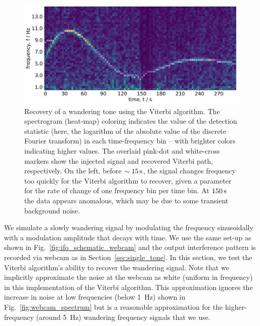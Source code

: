 \documentclass[paper-main.tex]{subfiles}
\begin{document}
\begin{figure}
	\includegraphics[width=\textwidth]{figures/expt_overlay_2_viterbi_test_webcam.pdf}
	\caption{\label{fig:viterbi_overlay}
Recovery of a wandering tone using the Viterbi algorithm.
The spectrogram (heat-map) coloring indicates the value of the detection statistic (here, the logarithm of the absolute value of the discrete Fourier transform) in each time-frequency bin -- with brighter colors indicating higher values. 
The overlaid pink-dot and white-cross markers show the injected signal and recovered Viterbi path, respectively. 
On the left, before $\sim 15\,{\rm s}$, the signal changes frequency too quickly for the Viterbi algorithm to recover, given a parameter for the rate of change of one frequency bin per time bin. 
At $150\,{\rm s}$ the data appears anomalous, which may be due to some transient background noise. }
\end{figure}
 

We simulate a slowly wandering signal by modulating the frequency sinusoidally with a modulation amplitude that decays with time. 
We use the same set-up as shown in Fig.~\ref{fig:ifo_schematic_webcam} and the output interference pattern is recorded via webcam as in Section~\ref{sec:single_tone}. 
In this section, we test the Viterbi algorithm’s ability to recover the wandering signal. 
Note that we implicitly approximate the noise at the webcam as white (uniform in frequency) in this implementation of the Viterbi algorithm. 
This approximation ignores the increase in noise at low frequencies (below 1~Hz) shown in Fig.~\ref{fig:webcam_spectrum} but is a reasonable approximation for the higher-frequency (around 5~Hz) wandering frequency signals that we use.
\end{document}
